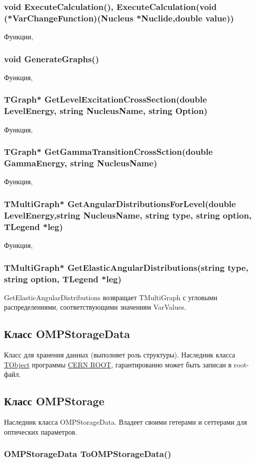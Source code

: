 \documentclass[a4paper,12pt]{extarticle}
\begin{document}
\subsubsection{void ExecuteCalculation(), ExecuteCalculation(void (*VarChangeFunction)(Nucleus *Nuclide,double value))}
Функции, 
\subsubsection{void GenerateGraphs()}
Функция, 
\subsubsection{TGraph* GetLevelExcitationCrossSection(double LevelEnergy, string NucleusName, string Option)}
Функция, 
\subsubsection{TGraph* GetGammaTransitionCrossSction(double GammaEnergy, string NucleusName)}
Функция, 
\subsubsection{TMultiGraph* GetAngularDistributionsForLevel(double LevelEnergy,string NucleusName, string type, string option, TLegend *leg)}
Функция, 
\subsubsection{TMultiGraph* GetElasticAngularDistributions(string type, string option, TLegend *leg)}
GetElasticAngularDistributions возвращает TMultiGraph с угловыми распределениями, соответствующими значениям VarValues.
\subsection{Класс OMPStorageData}
Класс для хранения данных (выполняет роль структуры). Наследник класса \href{https://root.cern/doc/master/classTObject.html}{TObject} программы \href{https://root.cern}{CERN ROOT}, гарантированно может быть записан в root-файл. 
\subsection{Класс OMPStorage}
Наследник класса OMPStorageData. Владеет своими гетерами и сеттерами для оптических параметров.
\subsubsection{OMPStorageData ToOMPStorageData()}
\end{document}
